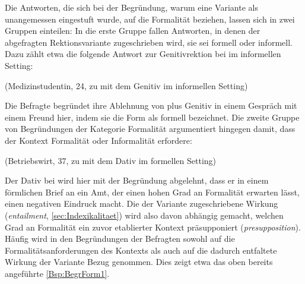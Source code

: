 Die Antworten, die sich bei der Begründung, warum eine Variante als unangemessen eingestuft wurde, auf die Formalität beziehen, lassen sich in zwei Gruppen einteilen:
In die erste Gruppe fallen Antworten, in denen der abgefragten Rektionsvariante zugeschrieben wird, sie sei formell oder informell. 
Dazu zählt etwa die folgende Antwort zur Genitivrektion bei \dank{} im informellen Setting: 
\begin{exe}
\ex {} (Medizinstudentin, 24, zu \dank{} mit dem Genitiv im informellen Setting)
\end{exe}
Die Befragte begründet ihre Ablehnung von \dank{} plus Genitiv in einem Gespräch mit einem Freund hier, indem sie die Form als formell bezeichnet. 
Die zweite Gruppe von Begründungen der Kategorie \glqq Formalität\grqq{} argumentiert hingegen damit, dass der Kontext Formalität oder Informalität erfordere:
\begin{exe}
\ex {} (Betriebswirt, 37, zu \wegen{} mit dem Dativ im formellen Setting)
\end{exe}
Der Dativ bei \wegen{} wird hier mit der Begründung abgelehnt, dass er in einem förmlichen Brief an ein Amt, der einen hohen Grad an Formalität erwarten lässt, einen negativen Eindruck macht.
Die der Variante zugeschriebene Wirkung (\textit{entailment}, \autoref{sec:Indexikalitaet}) wird also davon abhängig gemacht, welchen Grad an Formalität ein zuvor etablierter Kontext präsupponiert (\textit{presupposition}). 
Häufig wird in den Begründungen der Befragten sowohl auf die Formalitätsanforderungen des Kontexts als auch auf die dadurch entfaltete Wirkung der Variante Bezug genommen. 
Dies zeigt etwa das oben bereits angeführte \autoref{Bsp:BegrForm1}. 


